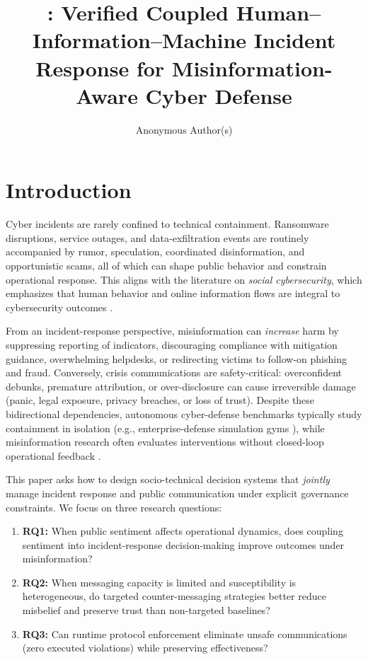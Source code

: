 \documentclass[sn-basic]{sn-jnl}
\title[\model{}]{\model{}: Verified Coupled Human--Information--Machine Incident Response for Misinformation-Aware Cyber Defense}
\author*[1]{Anonymous Author(s)}
\affil[1]{Anonymous affiliation(s)}
\begin{document}
\maketitle

\section{Introduction}
Cyber incidents are rarely confined to technical containment. Ransomware disruptions, service outages, and data-exfiltration events are routinely accompanied by rumor, speculation, coordinated disinformation, and opportunistic scams, all of which can shape public behavior and constrain operational response. This aligns with the literature on \emph{social cybersecurity}, which emphasizes that human behavior and online information flows are integral to cybersecurity outcomes \citep{carley2020social,mulahuwaish2025survey}.

From an incident-response perspective, misinformation can \emph{increase} harm by suppressing reporting of indicators, discouraging compliance with mitigation guidance, overwhelming helpdesks, or redirecting victims to follow-on phishing and fraud. Conversely, crisis communications are safety-critical: overconfident debunks, premature attribution, or over-disclosure can cause irreversible damage (panic, legal exposure, privacy breaches, or loss of trust). Despite these bidirectional dependencies, autonomous cyber-defense benchmarks typically study containment in isolation (e.g., enterprise-defense simulation gyms \citep{baillie2020cyborg,kunz2023multiagent}), while misinformation research often evaluates interventions without closed-loop operational feedback \citep{lazer2018science,vosoughi2018spread,kozyreva2024toolbox,lewandowsky2021inoculation,ng2021platform}.

This paper asks how to design socio-technical decision systems that \emph{jointly} manage incident response and public communication under explicit governance constraints. We focus on three research questions:
\begin{enumerate}[leftmargin=*]
  \item \textbf{RQ1:} When public sentiment affects operational dynamics, does coupling sentiment into incident-response decision-making improve outcomes under misinformation?
  \item \textbf{RQ2:} When messaging capacity is limited and susceptibility is heterogeneous, do targeted counter-messaging strategies better reduce misbelief and preserve trust than non-targeted baselines?
  \item \textbf{RQ3:} Can runtime protocol enforcement eliminate unsafe communications (zero executed violations) while preserving effectiveness?
\end{enumerate}
\end{document}
